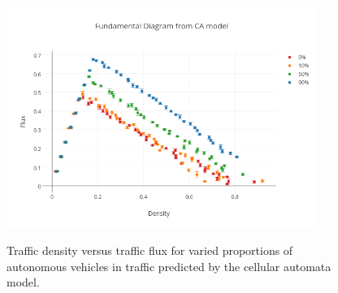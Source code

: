 \begin{figure}[h]
\centering
\includegraphics[width=0.9\textwidth]{img/flow-plot.png}\\
\caption{Traffic density versus traffic flux for varied proportions of autonomous vehicles in traffic predicted by the cellular automata model.}
\label{fig:flow-plot}
\end{figure}